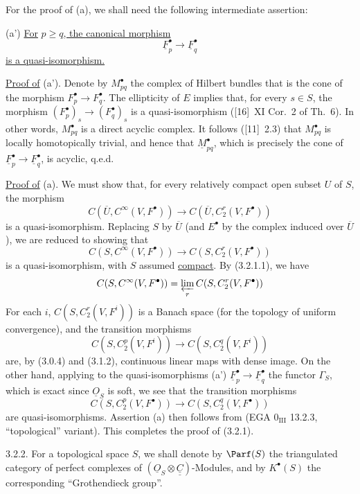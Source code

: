 For the proof of (a), we shall need the following intermediate assertion:

(a') \uline{For} $p\geq q$\uline{, the canonical morphism}
\[
  \underline F_p^\bullet\longrightarrow \underline F_q^\bullet
\]
\uline{is a quasi-isomorphism.}

\uline{Proof of} (a'). Denote by $M_{pq}^\bullet$ the complex of Hilbert bundles that is the cone of the morphism $F_p^\bullet\longrightarrow F_q^\bullet$. The ellipticity of $E$ implies that, for every $s\in S$, the morphism $(F_p^\bullet)_s\longrightarrow (F_q^\bullet)_s$ is a quasi-isomorphism ([16]~XI Cor.~2 of Th.~6). In other words, $M_{pq}^\bullet$ is a direct acyclic complex. It follows ([11]~2.3) that $M_{pq}^\bullet$ is locally homotopically trivial, and hence that $\underline M_{pq}^\bullet$, which is precisely the cone of $\underline F_p^\bullet\longrightarrow\underline F_q^\bullet$, is acyclic, q.e.d.

\uline{Proof of} (a). We must show that, for every relatively compact open subset $U$ of $S$, the morphism
%
\[
  C(\overline U,C^\infty(V,F^\bullet))
  \longrightarrow C(\overline U,C_2^r(V,F^\bullet))
\]
is a
quasi-isomorphism. Replacing $S$ by $\overline U$ (and $E^\bullet$ by the complex induced over $\overline U$), we are reduced to showing that
\[
  C(S,C^\infty(V,F^\bullet))
  \longrightarrow C(S,C_2^r(V,F^\bullet))
\]
is a quasi-isomorphism, with $S$ assumed \uline{compact}. By (3.2.1.1), we have
\[
  C(S,C^\infty(V,F^\bullet))=
  \varprojlim_r C(S,C_2^r(V,F^\bullet))
\]
For each $i$, $C(S,C_2^r(V,F^i))$ is a Banach space (for the topology of uniform convergence), and the transition morphisms
\[
  C(S,C_2^p(V,F^i))\longrightarrow C(S,C_2^q(V,F^i))
\]
are, by (3.0.4) and (3.1.2), continuous linear maps with dense image. On the other hand, applying to the quasi-isomorphisms (a') $\underline F_p^\bullet\longrightarrow\underline F_q^\bullet$ the functor $\Gamma_S$, which is exact since $\underline{O}_S$ is soft, we see that the transition morphisms
\[
  C(S,C_2^p(V,F^\bullet))\longrightarrow C(S,C_2^q(V,F^\bullet))
\]
are quasi-isomorphisms. Assertion (a) then follows from (EGA $0_{\mathrm{III}}$ 13.2.3, \textquotedblleft topological\textquotedblright{} variant). This completes the proof of (3.2.1).

3.2.2. For a topological space $S$, we shall denote by $\Parf(S)$ the triangulated category of perfect complexes of $(\underline{O}_S\otimes\underline{\underline{C}})$-Modules, and by $K^\bullet(S)$ the corresponding \textquotedblleft Grothendieck group\textquotedblright{}.


